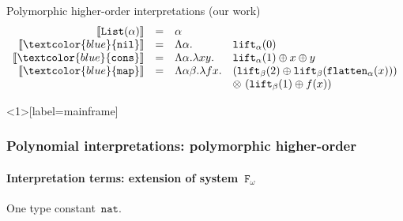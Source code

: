 \documentclass[10pt,presentation,color=names]{beamer}
\newcommand{\Fomega}{\mathtt{F}_\omega}
\newcommand{\nat}{\mathtt{nat}}
\newcommand{\flatten}{\mathtt{flatten}}
\newcommand{\lift}{\mathtt{lift}}
\newcommand{\typeinterpret}[1]{\llbracket #1 \rrbracket}
\newcommand{\interpret}[1]{\llbracket #1 \rrbracket}
\newcommand{\symb}[1]{\textcolor{blue}{\mathtt{#1}}}
\newcommand{\List}{\mathtt{List}}
\newcommand{\nil}{\symb{nil}}
\newcommand{\cons}{\symb{cons}}
\newcommand{\map}{\symb{map}}
\begin{document}
\begin{frame}{Polymorphic higher-order interpretations (our work)}
\[
\begin{array}{rcll}
\typeinterpret{\List(\alpha)} & = & \alpha \\
\interpret{\nil} & = & \Lambda \alpha. & \lift_\alpha(0) \\
\interpret{\cons} & = & \Lambda \alpha.\lambda xy. & \lift_\alpha(1) \oplus x \oplus y \\
\interpret{\map} & = & \Lambda \alpha\beta.\lambda f x. & (\lift_\beta(2) \oplus \lift_\beta(\flatten_\alpha(x))) \\
  & & & \otimes\ (\lift_\beta(1) \oplus f(x)) \\
\end{array}
\]
\end{frame}

\begin{frame}<1>[label=mainframe]
  \frametitle{Polynomial interpretations: polymorphic higher-order}
  \framesubtitle{Interpretation terms: extension of system~$\Fomega$}
  One type constant~$\nat$.\pause

  \medskip


\end{frame}
\end{document}
